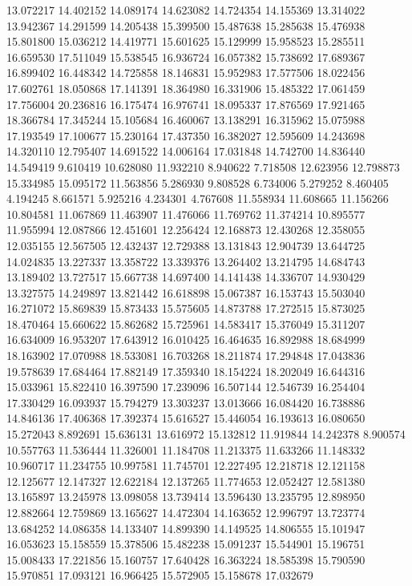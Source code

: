 13.072217
14.402152
14.089174
14.623082
14.724354
14.155369
13.314022
13.942367
14.291599
14.205438
15.399500
15.487638
15.285638
15.476938
15.801800
15.036212
14.419771
15.601625
15.129999
15.958523
15.285511
16.659530
17.511049
15.538545
16.936724
16.057382
15.738692
17.689367
16.899402
16.448342
14.725858
18.146831
15.952983
17.577506
18.022456
17.602761
18.050868
17.141391
18.364980
16.331906
15.485322
17.061459
17.756004
20.236816
16.175474
16.976741
18.095337
17.876569
17.921465
18.366784
17.345244
15.105684
16.460067
13.138291
16.315962
15.075988
17.193549
17.100677
15.230164
17.437350
16.382027
12.595609
14.243698
14.320110
12.795407
14.691522
14.006164
17.031848
14.742700
14.836440
14.549419
9.610419
10.628080
11.932210
8.940622
7.718508
12.623956
12.798873
15.334985
15.095172
11.563856
5.286930
9.808528
6.734006
5.279252
8.460405
4.194245
8.661571
5.925216
4.234301
4.767608
11.558934
11.608665
11.156266
10.804581
11.067869
11.463907
11.476066
11.769762
11.374214
10.895577
11.955994
12.087866
12.451601
12.256424
12.168873
12.430268
12.358055
12.035155
12.567505
12.432437
12.729388
13.131843
12.904739
13.644725
14.024835
13.227337
13.358722
13.339376
13.264402
13.214795
14.684743
13.189402
13.727517
15.667738
14.697400
14.141438
14.336707
14.930429
13.327575
14.249897
13.821442
16.618898
15.067387
16.153743
15.503040
16.271072
15.869839
15.873433
15.575605
14.873788
17.272515
15.873025
18.470464
15.660622
15.862682
15.725961
14.583417
15.376049
15.311207
16.634009
16.953207
17.643912
16.010425
16.464635
16.892988
18.684999
18.163902
17.070988
18.533081
16.703268
18.211874
17.294848
17.043836
19.578639
17.684464
17.882149
17.359340
18.154224
18.202049
16.644316
15.033961
15.822410
16.397590
17.239096
16.507144
12.546739
16.254404
17.330429
16.093937
15.794279
13.303237
13.013666
16.084420
16.738886
14.846136
17.406368
17.392374
15.616527
15.446054
16.193613
16.080650
15.272043
8.892691
15.636131
13.616972
15.132812
11.919844
14.242378
8.900574
10.557763
11.536444
11.326001
11.184708
11.213375
11.633266
11.148332
10.960717
11.234755
10.997581
11.745701
12.227495
12.218718
12.121158
12.125677
12.147327
12.622184
12.137265
11.774653
12.052427
12.581380
13.165897
13.245978
13.098058
13.739414
13.596430
13.235795
12.898950
12.882664
12.759869
13.165627
14.472304
14.163652
12.996797
13.723774
13.684252
14.086358
14.133407
14.899390
14.149525
14.806555
15.101947
16.053623
15.158559
15.378506
15.482238
15.091237
15.544901
15.196751
15.008433
17.221856
15.160757
17.640428
16.363224
18.585398
15.790590
15.970851
17.093121
16.966425
15.572905
15.158678
17.032679
